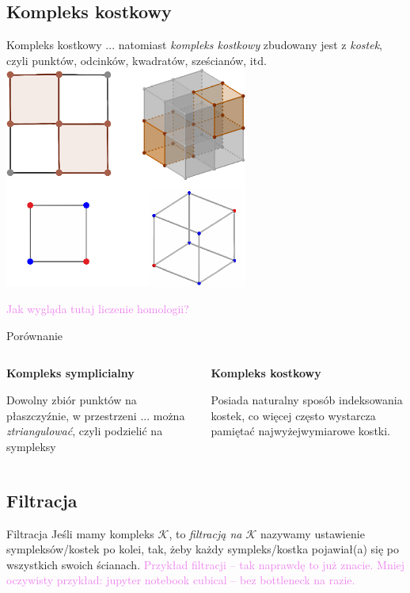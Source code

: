 \documentclass{beamer}
\newcommand{\comment}[1]{\textcolor{violet}{#1}}
\begin{document}
\subsection{Kompleks kostkowy}
\begin{frame}{Kompleks kostkowy}
  ... natomiast \emph{kompleks kostkowy} zbudowany jest z \emph{kostek},
  czyli punktów, odcinków, kwadratów, sześcianów, itd.
    \includegraphics[width=0.60\textwidth]{images/cubical-complex.png}
  \pause

  \comment{Jak wygląda tutaj liczenie homologii?}
\end{frame}
\begin{frame}{Porównanie}
  \begin{columns}[t]
    \pause
    \begin{column}{0.48\textwidth}
      \textbf{Kompleks symplicialny}
      \pause

      Dowolny zbiór punktów na płaszczyźnie, w przestrzeni ...
          można \emph{ztriangulować}, czyli podzielić na sympleksy
      
    \end{column}
    \pause
    \begin{column}{0.48\textwidth}
      \textbf{Kompleks kostkowy}
      \pause

      Posiada naturalny sposób indeksowania kostek,
        co więcej często wystarcza pamiętać najwyżejwymiarowe kostki.
    \end{column}
    
  \end{columns}
\end{frame}

\subsection{Filtracja}
\begin{frame}{Filtracja}
  Jeśli mamy kompleks $\mathcal{K}$, to \emph{filtracją na $\mathcal{K}$}
  nazywamy ustawienie sympleksów/kostek po kolei, tak, żeby każdy
  sympleks/kostka pojawiał(a) się po wszystkich swoich ścianach.
  \pause
  \comment{Przykład filtracji -- tak naprawdę to już znacie.}
  \pause
  \comment{Mniej oczywisty przykład: jupyter notebook cubical -- bez bottleneck na razie.}
\end{frame}
\end{document}

